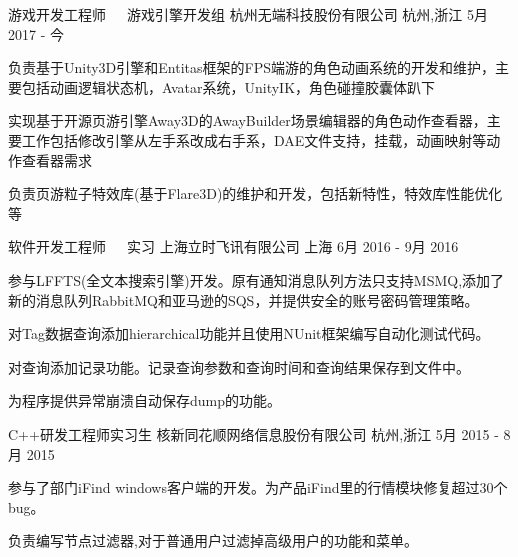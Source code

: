 


\begin{cventries}


\cventry
{游戏开发工程师~~~游戏引擎开发组} %
{杭州无端科技股份有限公司} %
{杭州,浙江} %
{5月~ 2017 - 今} %
{ %
\begin{cvitems}
\item {负责基于Unity3D引擎和Entitas框架的FPS端游的角色动画系统的开发和维护，主要包括动画逻辑状态机，Avatar系统，UnityIK，角色碰撞胶囊体趴下}
\item {实现基于开源页游引擎Away3D的AwayBuilder场景编辑器的角色动作查看器，主要工作包括修改引擎从左手系改成右手系，DAE文件支持，挂载，动画映射等动作查看器需求}
\item {负责页游粒子特效库(基于Flare3D)的维护和开发，包括新特性，特效库性能优化等}
\end{cvitems}
}


\cventry
{软件开发工程师~~~实习} %
{上海立时飞讯有限公司} %
{上海} %
{6月 2016 - 9月 2016} %
{ %
\begin{cvitems}
\item {参与LFFTS(全文本搜索引擎)开发。原有通知消息队列方法只支持MSMQ,添加了新的消息队列RabbitMQ和亚马逊的SQS，并提供安全的账号密码管理策略。}
\item {对Tag数据查询添加hierarchical功能并且使用NUnit框架编写自动化测试代码。}
\item {对查询添加记录功能。记录查询参数和查询时间和查询结果保存到文件中。}
\item {为程序提供异常崩溃自动保存dump的功能。}
\end{cvitems}
}


\cventry
{C++研发工程师实习生} %
{核新同花顺网络信息股份有限公司} %
{杭州,浙江} %
{5月 2015 - 8月 2015} %
{ %
\begin{cvitems}
\item {参与了部门iFind windows客户端的开发。为产品iFind里的行情模块修复超过30个bug。}
\item {负责编写节点过滤器,对于普通用户过滤掉高级用户的功能和菜单。}
\end{cvitems} 
}


\end{cventries}